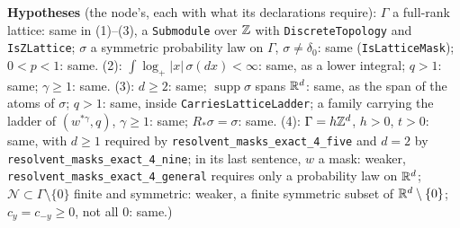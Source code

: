 \begin{proposition}
{\textbf{Hypotheses} (the node's, each with what its declarations require): $\Gamma$ a full-rank lattice:
same in (1)--(3), a \texttt{Submodule} over $\mathbb{Z}$ with \texttt{DiscreteTopology} and
\texttt{IsZLattice}; $\sigma$ a symmetric probability law on $\Gamma$, $\sigma \ne \delta_0$: same
(\texttt{IsLatticeMask}); $0 < p < 1$: same. (2): $\int\log_+|x|\,\sigma(dx) < \infty$: same, as
a lower integral; $q > 1$: same;
$\gamma \ge 1$: same. (3): $d \ge 2$: same; $\operatorname{supp}\sigma$ spans $\mathbb{R}^d$: same, as the
span of the atoms of $\sigma$; $q > 1$: same, inside \texttt{CarriesLatticeLadder}; a family
carrying the ladder of $(w^{*\gamma}, q)$, $\gamma \ge 1$: same; $R_*\sigma = \sigma$: same.
(4): $\Gamma = h\mathbb{Z}^d$, $h > 0$, $t > 0$: same, with $d \ge 1$ required by
\texttt{resolvent\_masks\_exact\_4\_five} and $d = 2$ by \texttt{resolvent\_masks\_exact\_4\_nine};
in its last sentence, $w$ a mask: weaker, \texttt{resolvent\_masks\_exact\_4\_general} requires only a
probability law on $\mathbb{R}^d$; $\mathcal{N} \subset \Gamma \setminus \{0\}$ finite and symmetric:
weaker, a finite symmetric subset of $\mathbb{R}^d \setminus \{0\}$; $c_y = c_{-y} \ge 0$, not all $0$:
same.)}
\end{proposition}

